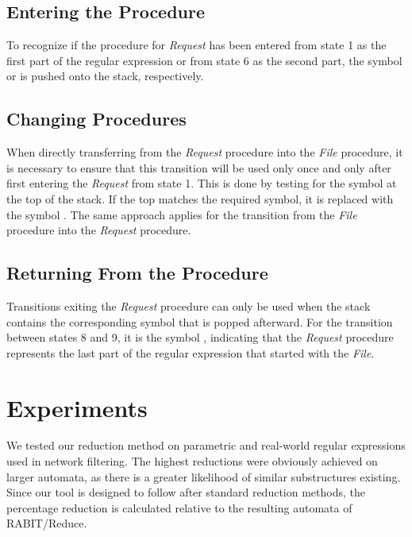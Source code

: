 \documentclass{ExcelAtFIT}
\newcommand{\circledtext}[2][red]{%
    \tikz[baseline=(char.base)]{
        \node[shape=circle, draw, fill=#1, inner sep=0pt] (char) {\hspace*{0.15mm}\textbf{\textcolor{#1}{#2}}};}\hspace*{-1mm}
}
\begin{document}
	\subsection*{Entering the Procedure}
		To recognize if the procedure for \textit{Request} has been entered from state 1 as the first part of the regular expression or from state 6 as the second part, the symbol \circledtext[orange]{1} or \circledtext[black!20!green]{6} is pushed onto the stack, respectively.

	\subsection*{Changing Procedures}
		When directly transferring from the \textit{Request} procedure into the \textit{File} procedure, it is necessary to ensure that this transition will be used only once and only after first entering the \textit{Request} from state 1. This is done by testing for the symbol \circledtext[orange]{1} at the top of the stack. If the top matches the required symbol, it is replaced with the symbol \circledtext[white!20!red]{5}. The same approach applies for the transition from the \textit{File} procedure into the \textit{Request} procedure.

	\subsection*{Returning From the Procedure}
		Transitions exiting the \textit{Request} procedure can only be used when the stack contains the corresponding symbol that is popped afterward. For the transition between states 8 and 9, it is the symbol \circledtext[black!20!green]{6}, indicating that the \textit{Request} procedure represents the last part of the regular expression that started with the \textit{File}.


\section{Experiments}
	We tested our reduction method on parametric and real-world regular expressions used in network filtering. The highest reductions were obviously achieved on larger automata, as there is a greater likelihood of similar substructures existing. Since our tool is designed to follow after standard reduction methods, the percentage reduction is calculated relative to the resulting automata of RABIT/Reduce.
\end{document}
